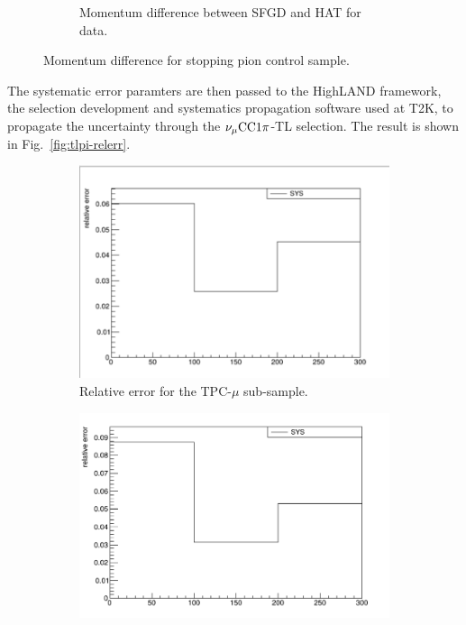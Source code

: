 \begin{figure}[h]
\begin{subfigure}[h]{\dbfigwid\textwidth}
          \caption{Momentum difference between SFGD and HAT for data.}
          \label{subfig:sfgp-hatp-dif-data}
          \end{subfigure}
          \caption{Momentum difference for stopping pion control sample.}
          \label{fig:sppi-res}
          \end{figure}

          The systematic error paramters are then passed to the HighLAND framework, the selection development and systematics propagation software used at T2K, to propagate the uncertainty through the $\nu_{\mu}\textrm{CC}1\pi$-TL selection.
          The result is shown in Fig.~\ref{fig:tlpi-relerr}.
          \begin{figure}[h]
          \centering
          \begin{subfigure}[h]{\dbfigwid\textwidth}
          \centering
          \includegraphics[width=\textwidth]{figures/sel/relerr-tpcmu.png}
          \caption{Relative error for the TPC-$\mu$ sub-sample.}
          \label{subfig:relerr-tpcmu}
          \end{subfigure}
          \hfill
          \begin{subfigure}[h]{\dbfigwid\textwidth}
          \centering
          \includegraphics[width=\textwidth]{figures/sel/relerr-sfgmu.png}

\end{subfigure}
\end{figure}

